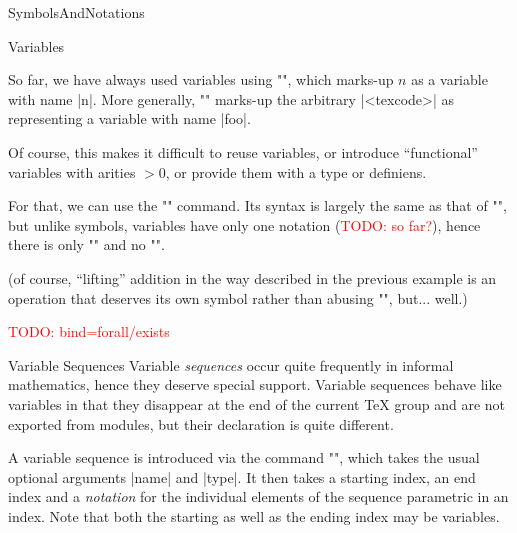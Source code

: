 \begin{smodule}[ns=https://github.com/slatex/sTeX/doc]{SymbolsAndNotations}
\begin{sfragment}{Variables}
    \begin{function}{\svar}
        So far, we have always used variables using \stexcode"",
        which marks-up $n$ as a variable with name |n|. More
        generally, \stexcode""
        marks-up the arbitrary |<texcode>| as representing a
        variable with name |foo|.
    \end{function}

    Of course, this makes it difficult to reuse variables,
    or introduce ``functional'' variables with arities $>0$,
    or provide them with a type or definiens.

    \begin{function}{\vardef}
        For that, we can use the \stexcode"\vardef" command. Its
        syntax is largely the same as that of \stexcode"\symdef",
        but unlike symbols, variables have only one notation 
        (\textcolor{red}{TODO: so far?}), hence there
        is only \stexcode"\vardef" and no \stexcode"\vardecl".
    \end{function}
    (of course, ``lifting'' addition in the way described
    in the previous example is an operation that deserves its
    own symbol rather than abusing \stexcode"\addition",
    but... well.)

    \textcolor{red}{TODO: bind=forall/exists}
\end{sfragment}

\begin{sfragment}{Variable Sequences}
    Variable \emph{sequences} occur quite frequently in informal
    mathematics, hence they deserve special support. Variable sequences
    behave like variables in that they disappear at the end of the
    current \TeX\xspace group and are not exported from modules,
    but their declaration is quite different.

    \begin{function}{\varseq}
        A variable sequence is introduced via the command
        \stexcode"\varseq", which takes the usual optional arguments
        |name| and |type|. It then takes a starting index,
        an end index and a \emph{notation} for the individual
        elements of the sequence parametric in an index. Note that both the starting as
        well as the ending index may be variables. 
    \end{function}


\end{sfragment}
\end{smodule}
